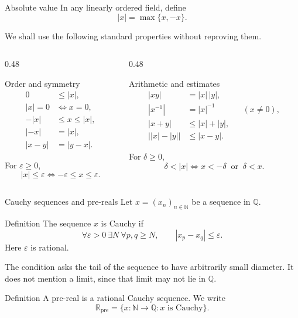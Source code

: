 \documentclass[aspectratio=169,11pt]{beamer}
\newcommand{\N}{\mathbb N}
\newcommand{\Q}{\mathbb Q}
\newcommand{\R}{\mathbb R}
\begin{document}
\begin{frame}{Absolute value}
  \small
  In any linearly ordered field, define
  \[
    \boxed{|x|=\max\{x,-x\}.}
  \]

  We shall use the following standard properties without reproving them.
  \begin{columns}[T,onlytextwidth]
    \begin{column}{0.48\textwidth}
      \begin{block}{Order and symmetry}
        \begin{align*}
          0&\le|x|,\\
          |x|=0&\Longleftrightarrow x=0,\\
          -|x|&\le x\le|x|,\\
          |-x|&=|x|,\\
          |x-y|&=|y-x|.
        \end{align*}
      \end{block}

      For \(\varepsilon\ge0\),
      \[
        |x|\le\varepsilon
        \Longleftrightarrow
        -\varepsilon\le x\le\varepsilon.
      \]
    \end{column}
    \begin{column}{0.48\textwidth}
      \begin{block}{Arithmetic and estimates}
        \begin{align*}
          |xy|&=|x|\,|y|,\\
          |x^{-1}|&=|x|^{-1} &&(x\ne0),\\
          |x+y|&\le|x|+|y|,\\
          \bigl||x|-|y|\bigr|&\le|x-y|.
        \end{align*}
      \end{block}

      For \(\delta\ge0\),
      \[
        \delta<|x|
        \Longleftrightarrow
        x<-\delta\ \text{ or }\ \delta<x.
      \]
    \end{column}
  \end{columns}
\end{frame}

\begin{frame}{Cauchy sequences and pre-reals}
  Let \(x=(x_n)_{n\in\N}\) be a sequence in \(\Q\).

  \begin{block}{Definition}
    The sequence \(x\) is \alert{Cauchy} if
    \[
      \forall\varepsilon>0\ \exists N\ \forall p,q\ge N,
      \qquad |x_p-x_q|\le\varepsilon.
    \]
    Here \(\varepsilon\) is rational.
  \end{block}

  The condition asks the tail of the sequence to have arbitrarily small
  diameter.  It does not mention a limit, since that limit may not lie in
  \(\Q\).

  \begin{block}{Definition}
    A \alert{pre-real} is a rational Cauchy sequence.  We write
    \[
      \R_{\mathrm{pre}}
        =\{x\colon\N\to\Q:x\text{ is Cauchy}\}.
    \]
  \end{block}
\end{frame}
\end{document}

